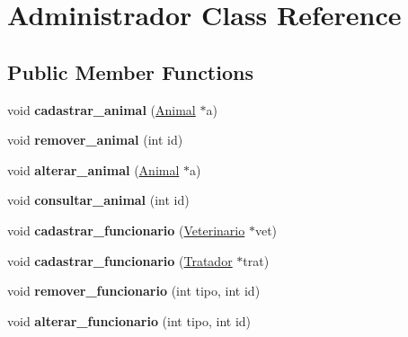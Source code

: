 \hypertarget{classAdministrador}{}\section{Administrador Class Reference}
\label{classAdministrador}
\subsection*{Public Member Functions}
\begin{DoxyCompactItemize}
\item 
\mbox{\label{classAdministrador_a365f36df7a287e35909cc7b72faabf96}} 
void {\bfseries cadastrar\+\_\+animal} (\hyperlink{classAnimal}{Animal} $\ast$a)
\item 
\mbox{\label{classAdministrador_a22da7420abdc1d3e07a7f06b86c95d76}} 
void {\bfseries remover\+\_\+animal} (int id)
\item 
\mbox{\label{classAdministrador_ae70fee426b0ccdacd32eec60df52ed8e}} 
void {\bfseries alterar\+\_\+animal} (\hyperlink{classAnimal}{Animal} $\ast$a)
\item 
\mbox{\label{classAdministrador_a4b08b6c97a490048d7735f18c71fd2c4}} 
void {\bfseries consultar\+\_\+animal} (int id)
\item 
\mbox{\label{classAdministrador_a713cc42b54d9cccfdc38d4d37c55cbdb}} 
void {\bfseries cadastrar\+\_\+funcionario} (\hyperlink{classVeterinario}{Veterinario} $\ast$vet)
\item 
\mbox{\label{classAdministrador_adaf47530d37f63e97d31a7bc83c6530e}} 
void {\bfseries cadastrar\+\_\+funcionario} (\hyperlink{classTratador}{Tratador} $\ast$trat)
\item 
\mbox{\label{classAdministrador_a2d9f49941d7f58ebd1ff880fa69e20fa}} 
void {\bfseries remover\+\_\+funcionario} (int tipo, int id)
\item 
\mbox{\label{classAdministrador_a879756d6db1f57a29ac4a8c36c0c71b8}} 
void {\bfseries alterar\+\_\+funcionario} (int tipo, int id)
\item 

\end{DoxyCompactItemize}
